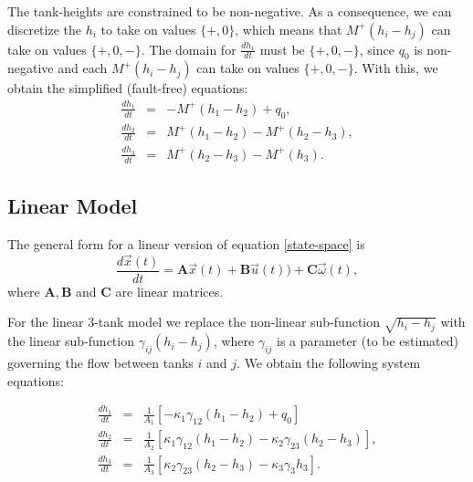 The tank-heights are constrained to be non-negative. As a consequence,
we can discretize the $h_i$ to take on values $\{+, 0\}$, which means that $M^+(h_i - h_j)$ can take on values $\{+, 0, -\}$. 
The domain for $\frac{d h_1}{dt}$ must be $\{+, 0, -\}$, since $q_0$ is non-negative and each  $M^+(h_i - h_j)$ can take on values $\{+, 0, -\}$.
With this, we obtain the simplified (fault-free) equations:
\begin{eqnarray}
\frac{d h_1}{dt} & = &   -  M^+(h_1 - h_2) + q_0,  \label{eq:qual-ode-simple} \\
\frac{d h_2}{dt} &  = &    M^+(h_{1}-h_{2}) - M^+(h_2-h_3),\\
\frac{d h_3}{dt} & = &    M^+(h_2-h_3) - M^+(h_3).
\end{eqnarray}


\subsection{Linear Model}

The general form for a linear version of  equation \ref{state-space} is
\begin{equation}\label{linear-state-space}
\frac{d \vec{x}(t)}{dt} = \mathbf{A} \vec{x}(t) + \mathbf{B} \vec{u}(t)) + \mathbf{C} \vec{\omega}(t),
\end{equation}
where $\mathbf{A}, \mathbf{B}$ and $\mathbf{C}$ are linear matrices.

For the linear 3-tank model we replace the non-linear sub-function
$ \sqrt{h_i - h_j}$ with the linear sub-function $\gamma_{ij} (h_i - h_j)$, where $\gamma_{ij}$ is a parameter (to be estimated) governing the flow between tanks $i$ and $j$. We obtain the following system equations:

\begin{eqnarray} \label{eq:linear-ode1}
\frac{d h_1}{dt} & = & \frac{1}{A_1}\left[  - \kappa_1 \gamma_{12} (h_1 - h_2) + q_0 \right]  \\%
\frac{d h_2}{dt} &  = & \frac{1}{A_2}\left[   \kappa_{1} \gamma_{12} (h_{1}-h_{2}) - \kappa_2 \gamma_{23} (h_2-h_3)\right],\\
\frac{d h_3}{dt} & = & \frac{1}{A_3}\left[   \kappa_{2} \gamma_{23} (h_2-h_3) - \kappa_3 \gamma_{3} h_3\right].
\end{eqnarray}

